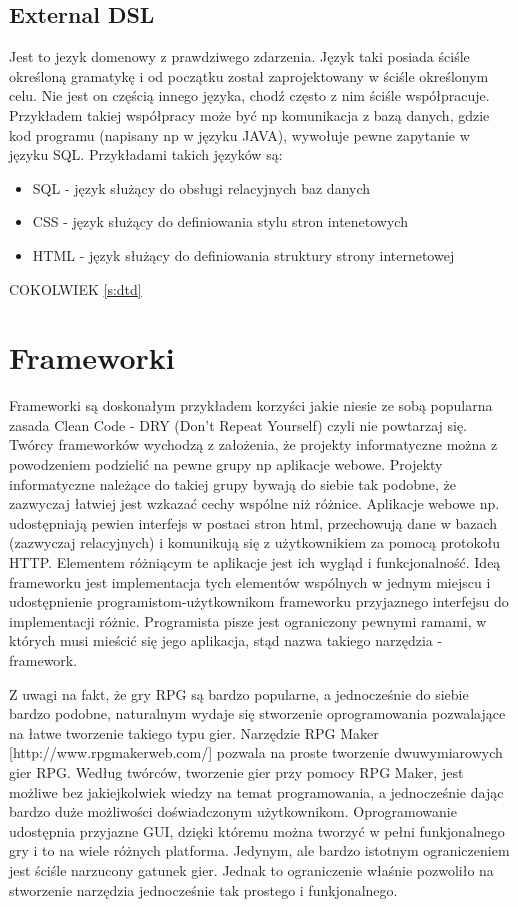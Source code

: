 \documentclass	{xmgr}
\begin{document}
\subsection{External DSL}

Jest to jezyk domenowy z prawdziwego zdarzenia. Język taki posiada ściśle określoną gramatykę i od początku został zaprojektowany w ściśle określonym celu. Nie jest on częścią innego języka, chodź często z nim ściśle współpracuje. Przykładem takiej współpracy może być np komunikacja z bazą danych, gdzie kod programu (napisany np w języku JAVA), wywołuje pewne zapytanie w języku SQL. Przykładami takich języków są:
\begin{itemize}
	\item SQL - język służący do obsługi relacyjnych baz danych
	\item CSS - język służący do definiowania stylu stron intenetowych 
	\item HTML - język służący do definiowania struktury strony internetowej
\end{itemize}

COKOLWIEK \cite{Eisenberg:2002:SXM,Goldfarb:2002:CFG} \ref{s:dtd}

\section{Frameworki}

Frameworki są doskonałym przykładem korzyści jakie niesie ze sobą popularna zasada Clean Code - DRY (Don't Repeat Yourself) czyli nie powtarzaj się. 
Twórcy frameworków  wychodzą z założenia, że projekty informatyczne można z powodzeniem podzielić na pewne grupy np aplikacje webowe. Projekty informatyczne należące do takiej grupy bywają do siebie tak podobne, że zazwyczaj łatwiej jest wzkazać cechy wspólne niż różnice. Aplikacje webowe np. udostępniają pewien interfejs w postaci stron html, przechowują dane w bazach (zazwyczaj relacyjnych) i komunikują się z użytkownikiem za pomocą protokołu HTTP. Elementem różniącym te aplikacje jest ich wygląd i funkcjonalność. Ideą frameworku jest implementacja tych elementów wspólnych w jednym miejscu i udostępnienie programistom-użytkownikom frameworku przyjaznego interfejsu do implementacji różnic. Programista pisze jest ograniczony pewnymi ramami, w których musi mieścić się jego aplikacja, stąd nazwa takiego narzędzia - framework.

Z uwagi na fakt, że gry RPG są bardzo popularne, a jednocześnie do siebie bardzo podobne, naturalnym wydaje się stworzenie oprogramowania pozwalające na łatwe tworzenie takiego typu gier. Narzędzie RPG Maker [http://www.rpgmakerweb.com/] pozwala na proste tworzenie dwuwymiarowych gier RPG. Według twórców, tworzenie gier przy pomocy RPG Maker, jest możliwe bez jakiejkolwiek wiedzy na temat programowania, a jednocześnie dając bardzo duże możliwości doświadczonym użytkownikom. Oprogramowanie udostępnia przyjazne GUI, dzięki któremu można tworzyć w pełni funkjonalnego gry i to na wiele różnych platforma. Jedynym, ale bardzo istotnym ograniczeniem jest ściśle narzucony gatunek gier. Jednak to ograniczenie właśnie pozwoliło na stworzenie narzędzia jednocześnie tak prostego i funkjonalnego. 
\end{document}
